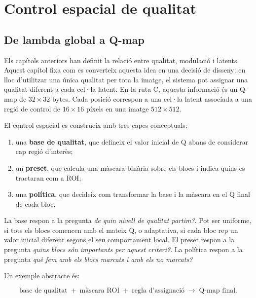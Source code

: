 \chapter{Control espacial de qualitat}\label{ch:control}
\fancyhead[LO]{\slshape \textsf{\nouppercase \rightmark}}

\section{De lambda global a Q-map}\label{sec:qmap_intro}

Els capítols anteriors han definit la relació entre qualitat, modulació i
latents. Aquest capítol fixa com es converteix aquesta idea en una decisió de
disseny: en lloc d'utilitzar una única qualitat per tota la imatge, el sistema
pot assignar una qualitat diferent a cada cel·la latent. En la ruta C, aquesta
informació és un Q-map de $32\times32$ bytes. Cada posició correspon a una
cel·la latent associada a una regió de control de $16\times16$ píxels en una
imatge $512\times512$.

El control espacial es construeix amb tres capes conceptuals:

\begin{enumerate}[leftmargin=*]
  \item una \textbf{base de qualitat}, que defineix el valor inicial de Q abans
  de considerar cap regió d'interès;
  \item un \textbf{preset}, que calcula una màscara binària sobre els blocs i
  indica quins es tractaran com a ROI;
  \item una \textbf{política}, que decideix com transformar la base i la màscara
  en el Q final de cada bloc.
\end{enumerate}

La base respon a la pregunta \emph{de quin nivell de qualitat partim?}. Pot ser
uniforme, si tots els blocs comencen amb el mateix Q, o adaptativa, si cada bloc
rep un valor inicial diferent segons el seu comportament local. El preset respon
a la pregunta \emph{quins blocs són importants per aquest criteri?}. La política
respon a la pregunta \emph{què fem amb els blocs marcats i amb els no marcats?}

Un exemple abstracte és:

\begin{equation}
\text{base de qualitat}
\;+\;
\text{màscara ROI}
\;+\;
\text{regla d'assignació}
\;\longrightarrow\;
\text{Q-map final}.
\end{equation}


